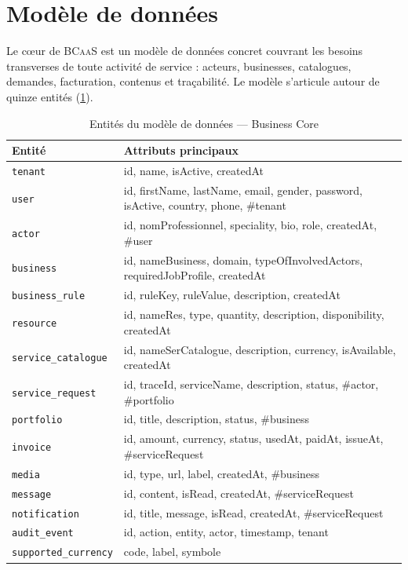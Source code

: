 \documentclass[12pt,a4paper]{report}
\theoremstyle{definition}
\theoremstyle{remark}
\newcommand{\bcaas}{\textsc{BCaaS}}
\begin{document}
\section{Modèle de données}

Le cœur de \bcaas{} est un modèle de données concret couvrant les besoins transverses de toute activité de service : acteurs, businesses, catalogues, demandes, facturation, contenus et traçabilité. Le modèle s'articule autour de quinze entités (\cref{tab:entites}).

\begin{table}[h]
	\centering
	\caption{Entités du modèle de données — Business Core}
	\label{tab:entites}
	\small
	\begin{tabularx}{\textwidth}{lX}
		\toprule
		\textbf{Entité} & \textbf{Attributs principaux} \\
		\midrule
		\texttt{tenant} & id, name, isActive, createdAt \\
		\texttt{user} & id, firstName, lastName, email, gender, password, isActive, country, phone, \#tenant \\
		\texttt{actor} & id, nomProfessionnel, speciality, bio, role, createdAt, \#user \\
		\texttt{business} & id, nameBusiness, domain, typeOfInvolvedActors, requiredJobProfile, createdAt \\
		\texttt{business\_rule} & id, ruleKey, ruleValue, description, createdAt \\
		\texttt{resource} & id, nameRes, type, quantity, description, disponibility, createdAt \\
		\texttt{service\_catalogue} & id, nameSerCatalogue, description, currency, isAvailable, createdAt \\
		\texttt{service\_request} & id, traceId, serviceName, description, status, \#actor, \#portfolio \\
		\texttt{portfolio} & id, title, description, status, \#business \\
		\texttt{invoice} & id, amount, currency, status, usedAt, paidAt, issueAt, \#serviceRequest \\
		\texttt{media} & id, type, url, label, createdAt, \#business \\
		\texttt{message} & id, content, isRead, createdAt, \#serviceRequest \\
		\texttt{notification} & id, title, message, isRead, createdAt, \#serviceRequest \\
		\texttt{audit\_event} & id, action, entity, actor, timestamp, tenant \\
		\texttt{supported\_currency} & code, label, symbole \\
		\bottomrule
	\end{tabularx}
\end{table}
\end{document}
